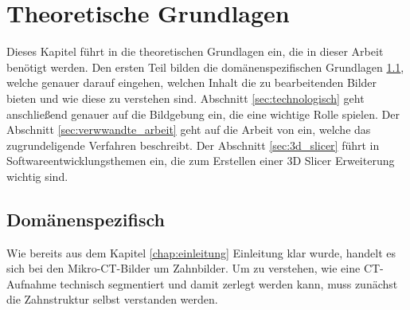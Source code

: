 \chapter{Theoretische Grundlagen}
\label{chap:theoretische_grundlagen} Dieses Kapitel führt in die theoretischen Grundlagen
ein, die in dieser Arbeit benötigt werden. Den ersten Teil bilden die domänenspezifischen
Grundlagen \ref{sec:domänenspezifisch}, welche genauer darauf eingehen, welchen Inhalt
die zu bearbeitenden Bilder bieten und wie diese zu verstehen sind. Abschnitt
\ref{sec:technologisch} geht anschließend genauer auf die Bildgebung ein, die eine
wichtige Rolle spielen. Der Abschnitt \ref{sec:verwwandte_arbeit} geht auf die
Arbeit von \citet{hoffmann2020} ein, welche das zugrundeligende Verfahren
beschreibt. Der Abschnitt \ref{sec:3d_slicer} führt in Softwareentwicklungsthemen
ein, die zum Erstellen einer 3D Slicer Erweiterung wichtig sind.

\section{Domänenspezifisch}
\label{sec:domänenspezifisch} Wie bereits aus dem Kapitel \ref{chap:einleitung}
Einleitung klar wurde, handelt es sich bei den Mikro-\ac{CT}-Bilder um
Zahnbilder. Um zu verstehen, wie eine \ac{CT}-Aufnahme technisch segmentiert und
damit zerlegt werden kann, muss zunächst die Zahnstruktur selbst verstanden
werden.

